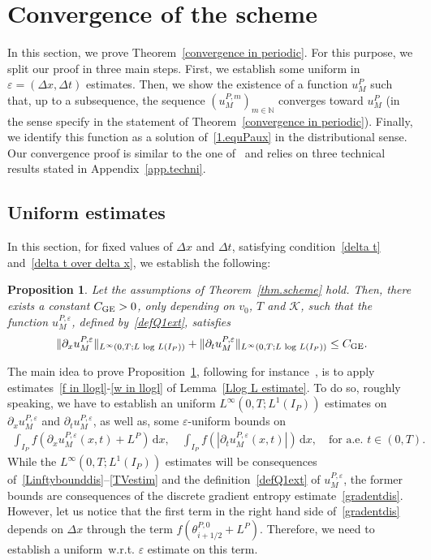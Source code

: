 \documentclass[11pt]{amsart}
\newtheorem{proposition}{Proposition}
\newcommand{\K}{\mathcal{K}}
\newcommand{\dd}{\mathrm{d}}
\newcommand{\pa}{\partial}
\newcommand{\N}{\mathbb{N}}
\newcommand{\eps}{\varepsilon}
\begin{document}
\section{Convergence of the scheme}\label{convergence}
In this section, we prove Theorem~\ref{convergence in periodic}. For this purpose, we split our proof in three main steps. First, we establish some uniform in $\eps=(\Delta x, \Delta t)$ estimates. Then, we show the existence of a function $u^P_M$ such that, up to a subsequence, the sequence $(u^{P,m}_M)_{m \in \N}$ converges toward $u^P_M$ (in the sense specify in the statement of Theorem~\ref{convergence in periodic}). Finally, we identify this function as a solution of~\eqref{1.equPaux} in the distributional sense. Our convergence proof is similar to the one of~\cite{2} and relies on three technical results stated in Appendix~\ref{app.techni}.

\subsection{Uniform estimates}\label{sec.unifestimates}

In this section, for fixed values of $\Delta x$ and $\Delta t$, satisfying condition~\eqref{delta t} and~\eqref{delta t over delta x}, we establish the following:

\begin{proposition}\label{prop.unif}
Let the assumptions of Theorem~\ref{thm.scheme} hold. Then, there exists a constant ${C}_{\rm GE}>0$, only depending on $v_0$, $T$ and $\K$, such that the function $u^{P,\eps}_M$, defined by~\eqref{defQ1ext}, satisfies
\begin{align}\label{estimationLlogLGE}
    \|\pa_x u^{P,\eps}_M\|_{L^\infty(0,T;L\,\log\,L(I_P))} + \|\pa_t u^{P,\eps}_M\|_{L^\infty(0,T;L\,\log\,L(I_P))} \leq {C}_{\rm GE}.
\end{align}
\end{proposition}


The main idea to prove Proposition~\ref{prop.unif}, following for instance~\cite{2}, is to apply estimates~\eqref{f in llogl}-\eqref{w in llogl} of Lemma~\ref{Llog L estimate}. To do so, roughly speaking, we have to establish an uniform $L^\infty(0,T;L^1(I_P))$ estimates on $\pa_x u^{P,\eps}_M$ and $\pa_t u^{P,\eps}_M$, as well as, some $\eps$-uniform bounds on
\begin{align*}%
    \int_{I_P} f\left(\pa_x u^{P,\eps}_M(x,t)+L^P\right) \, \dd x, \quad \int_{I_P} f\left(\left|\pa_t u^{P,\eps}_M(x,t)\right|\right) \, \dd x, \quad \mbox{for a.e. }t\in (0,T).
\end{align*}
While the $L^\infty(0,T;L^1(I_P))$ estimates will be consequences of~\eqref{Linftybounddis}--\eqref{TVestim} and the definition~\eqref{defQ1ext} of $u^{P,\eps}_M$, the former bounds are consequences of the discrete gradient entropy estimate~\eqref{gradentdis}. However, let us notice that the first term in the right hand side of~\eqref{gradentdis} depends on $\Delta x$ through the term $f(\theta^{P,0}_{i+1/2}+L^P)$. Therefore, we need to establish a uniform~w.r.t. $\eps$ estimate on this term.
\end{document}
